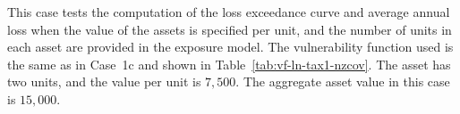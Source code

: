 This case tests the computation of the loss exceedance curve and average annual loss when the value of the assets is specified per unit, and the number of units in each asset are provided in the exposure model. The vulnerability function used is the same as in Case~1c and shown in Table~\ref{tab:vf-ln-tax1-nzcov}. The asset has two units, and the value per unit is $7,500$. The aggregate asset value in this case is $15,000$.